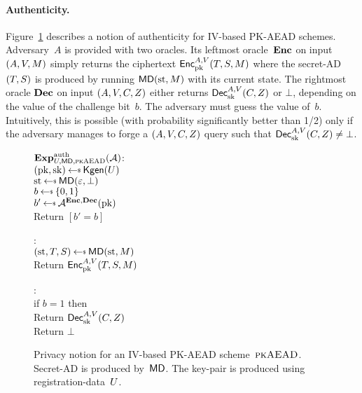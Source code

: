 \paragraph{Authenticity. }  Figure~\ref{fig:pkaead-notions-2} describes a notion of authenticity for IV-based PK-AEAD schemes.  Adversary~$A$ is provided with two oracles.  Its leftmost oracle~$\textbf{Enc}$ on input $(A,V,M)$ simply returns the ciphertext ${\mathsf{Enc}}_{\mathrm{pk}}^{A,V}(T,S,M)$ where the secret-AD $(T,S)$ is produced by running $\mathsf{MD}(\mathrm{st},M)$ with its current state.  The rightmost oracle $\textbf{Dec}$ on input $(A,V,C,Z)$ either returns ${\mathsf{Dec}}_{\mathrm{sk}}^{A,V}(C,Z)$ or $\bot$, depending on the value of the challenge bit~$b$.  The adversary must guess the value of~$b$.  Intuitively, this is possible (with probability significantly better than 1/2) only if the adversary manages to forge a $(A,V,C,Z)$ query such that ${\mathsf{Dec}}_{\mathrm{sk}}^{A,V}(C,Z) \neq \bot$.

\begin{figure}[tbhp]
\begin{center}
{
{
 \underline{$\mathbf{Exp}^{\mathrm{auth}}_{U,\mathsf{MD},\textsc{pkAEAD}}{({\cal A})}$}:\\[2pt]
 $(\pk,\sk)\getsr\Kgen(\kreg)$\\
 $\st \getsr \mdalg(\emptystring,\bot)$\\
 $b\getsr\bits$\\
 $b'\getsr\advA^{\encOracle,\decOracle}(\pk)$\\
 Return $[b'=b]$
}
{
:\\[2pt]
 $(\st,\umd,\rmd) \getsr \mdalg(\st,M)$\\
 Return ${\mathsf{Enc}}_{\mathrm{pk}}^{A,V}(T,S,M)$

\medskip
{}:\\[2pt]
 if $b=1$ then\\
 \nudge Return ${\mathsf{Dec}}_{\mathrm{sk}}^{A,V}(C,Z)$\\
Return $\bot$
}
}
\caption{Privacy notion for an IV-based PK-AEAD
  scheme~$\textsc{pkAEAD}$.  Secret-AD is produced by~$\mathsf{MD}$.  The key-pair
  is produced using registration-data~$U$.} 
\label{fig:pkaead-notions-2}
\end{center}
\end{figure}


